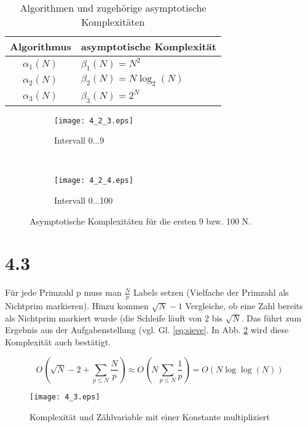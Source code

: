 \documentclass[a4paper,11pt]{article}
\theoremstyle{definition}
\theoremstyle{plain}
\theoremstyle{remark}
\begin{document}
\begin{table}
\centering
\begin{tabular}{|c|l|}
\hline
Algorithmus & asymptotische Komplexit\"at \\\hline
$\alpha_1(N)$ & $\beta_1(N)=N^2$ \\\hline
$\alpha_2(N)$ & $\beta_2(N)=N\log_2(N)$ \\\hline
$\alpha_3(N)$ & $\beta_3(N)=2^N$ \\\hline
\end{tabular}
\caption{Algorithmen und zugeh\"orige asymptotische Komplexit\"aten}
\label{tab:asy}
\end{table}

\begin{figure}
\centering
\begin{subfigure}{0.45\textwidth}
\centering
\texttt{[image: 4\_2\_3.eps]}
\caption{Intervall 0...9}
\end{subfigure}
~
\begin{subfigure}{0.45\textwidth}
\centering
\texttt{[image: 4\_2\_4.eps]}
\caption{Intervall 0...100}
\end{subfigure}
\caption{Asymptotische Komplexit\"aten f\"ur die ersten 9 bzw. 100 N.}
\label{fig:Kompl}
\end{figure}

\section*{4.3}
F\"ur jede Primzahl p muss man $\frac{N}{p}$ Labels setzen (Vielfache der Primzahl als Nichtprim markieren). Hinzu kommen $\sqrt{N}-1$ Vergleiche, ob eine Zahl bereits als Nichtprim markiert wurde (die Schleife l\"auft von 2 bis $\sqrt{N}$. Das f\"uhrt zum Ergebnis aus der Aufgabenstellung (vgl. Gl. \ref{eq:sieve}. In Abb. \ref{fig:sieve} wird diese Komplexit\"at auch best\"atigt.

\begin{equation}
O(\sqrt{N}-2 + \sum_{p\le N}\frac{N}{p}) \approx O(N\sum_{p\le N}\frac{1}{p}) = O(N\log\log(N))
\label{eq:sieve}
\end{equation}

\begin{figure}
\centering
\texttt{[image: 4\_3.eps]}
\caption{Komplexit\"at und Z\"ahlvariable mit einer Konstante multipliziert}
\label{fig:sieve}
\end{figure}

\clearpage
\end{document}

